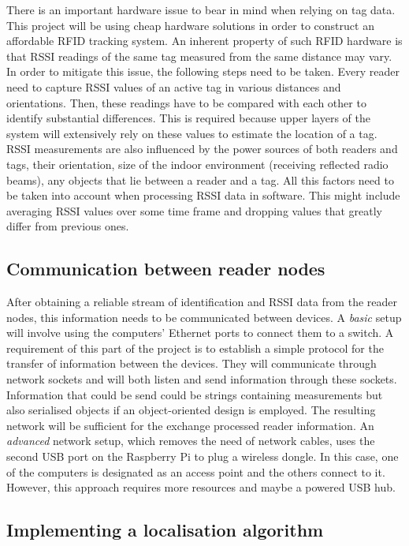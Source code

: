 There is an important hardware issue to bear in mind when relying on tag data. This project will be using cheap hardware solutions in order to construct an affordable RFID tracking system. An inherent property of such RFID hardware is that RSSI readings of the same tag measured from the same distance may vary. In order to mitigate this issue, the following steps need to be taken. Every reader need to capture RSSI values of an active tag in various distances and orientations. Then, these readings have to be compared with each other to identify substantial differences. This is required because  upper layers of the system will extensively rely on these values to estimate the location of a tag. RSSI measurements are also influenced by the power sources of both readers and tags, their orientation, size of the indoor environment (receiving reflected radio beams), any objects that lie between a reader and a tag. All this factors need to be taken into account when processing RSSI data in software. This might include averaging RSSI values over some time frame and dropping values that greatly differ from previous ones.

\subsection{Communication between reader nodes}

After obtaining a reliable stream of identification and RSSI data from the reader nodes, this information needs to be communicated between devices. A \textit{basic} setup will involve using the computers' Ethernet ports to connect them to a switch. A requirement of this part of the project is to establish a simple protocol for the transfer of information between the devices. They will communicate through network sockets and will both listen and send information through these sockets. Information that could be send could be strings containing measurements but also serialised objects if an object-oriented design is employed. The resulting network will be sufficient for the exchange processed reader information. An \textit{advanced} network setup, which removes the need of network cables, uses the second USB port on the Raspberry Pi to plug a wireless dongle. In this case, one of the computers is designated as an access point and the others connect to it. However, this approach requires more resources and maybe a powered USB hub.

\subsection{Implementing a localisation algorithm}

